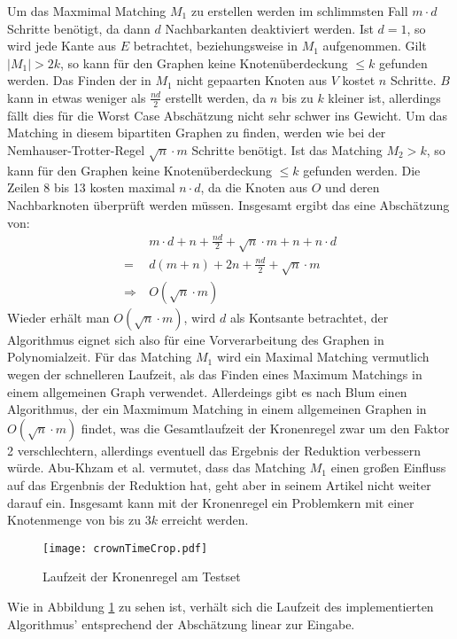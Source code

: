 Um das Maxmimal Matching $M_{1}$ zu erstellen werden im schlimmsten Fall $m \cdot d$ Schritte benötigt, da dann $d$ Nachbarkanten deaktiviert werden. Ist $d = 1$, so wird jede Kante aus $E$ betrachtet, beziehungsweise in $M_{1}$ aufgenommen. Gilt $|M_{1}| > 2k$, so kann für den Graphen keine Knotenüberdeckung  $ \leq k$ gefunden werden. Das Finden der in $M_{1}$ nicht gepaarten Knoten aus $V$ kostet $n$ Schritte. $B$ kann in etwas weniger als $\frac{nd}{2}$ erstellt werden, da $n$ bis zu $k$ kleiner ist, allerdings fällt dies für die Worst Case Abschätzung nicht sehr schwer ins Gewicht. Um das Matching in diesem bipartiten Graphen zu finden, werden wie bei der Nemhauser-Trotter-Regel  $\sqrt{n} \cdot m$ Schritte benötigt. Ist das Matching $M_{2} > k$, so kann für den Graphen keine Knotenüberdeckung  $ \leq k$ gefunden werden. Die Zeilen 8 bis 13 kosten maximal $n \cdot d$, da die Knoten aus $O$ und deren Nachbarknoten überprüft werden müssen. Insgesamt ergibt das eine Abschätzung von:
\begin{align}
&\ m \cdot d + n + \frac{nd}{2} + \sqrt{n} \cdot m + n  + n \cdot d \\
=&\ d (m+n) +2 n + \frac{nd}{2} + \sqrt{n} \cdot m \\
\Rightarrow &\ O(\sqrt{n} \cdot m)
\end{align}
Wieder erhält man $O(\sqrt{n} \cdot m)$, wird $d$ als Kontsante betrachtet, der Algorithmus eignet sich also für eine Vorverarbeitung des Graphen in Polynomialzeit. Für das Matching $M_{1}$ wird ein Maximal Matching vermutlich wegen der schnelleren Laufzeit, als das Finden eines Maximum Matchings in einem allgemeinen Graph verwendet. Allerdeings gibt es nach Blum \cite{paper:8} einen Algorithmus, der ein Maxmimum Matching in einem allgemeinen Graphen in $O(\sqrt{n} \cdot m)$ findet, was die Gesamtlaufzeit der Kronenregel zwar um den Faktor 2 verschlechtern, allerdings eventuell das Ergebnis der Reduktion verbessern würde. Abu-Khzam et al. \cite{paper:7} vermutet, dass das Matching $M_{1}$ einen großen Einfluss auf das Ergenbnis der Reduktion hat, geht aber in seinem Artikel nicht weiter darauf ein. Insgesamt kann mit der Kronenregel ein Problemkern mit einer Knotenmenge von bis zu $3k$ erreicht werden.
\begin{figure}[htb]
\centering
  	{\texttt{[image: crownTimeCrop.pdf]}}
	\caption{Laufzeit der Kronenregel am Testset\label{fig:crownTime}}
\centering
\end{figure}
Wie in Abbildung \ref{fig:crownTime} zu sehen ist, verhält sich die Laufzeit des implementierten Algorithmus' entsprechend der Abschätzung linear zur Eingabe.
